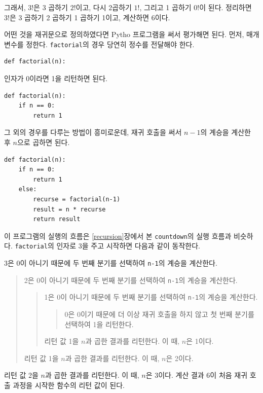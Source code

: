 \documentclass[10pt]{book}
\begin{document}
그래서, $3!$은 3 곱하기 $2!$이고, 다시 2곱하기 $1!$, 그리고 1 곱하기
$0!$이 된다.  정리하면 $3!$은 3 곱하기 2 곱하기 1 곱하기 1이고,
계산하면 6이다.

어떤 것을 재귀문으로 정의하였다면 Pytho 프로그램을 써서 평가해면 된다.
먼저, 매개 변수를 정한다.  {\tt factorial}의 경우 당연히 정수를
전달해야 한다.

\begin{verbatim}
def factorial(n):
\end{verbatim}
%
인자가 0이라면 1을 리턴하면 된다.

\begin{verbatim}
def factorial(n):
    if n == 0:
        return 1
\end{verbatim}
%
그 외의 경우를 다루는 방법이 흥미로운데, 재귀 호출을 써서 $n-1$의
계승을 계산한 후 $n$으로 곱하면 된다.

\begin{verbatim}
def factorial(n):
    if n == 0:
        return 1
    else:
        recurse = factorial(n-1)
        result = n * recurse
        return result
\end{verbatim}
%
이 프로그램의 실행의 흐름은 \ref{recursion}장에서 본 {\tt countdown}의
실행 흐름과 비슷하다. {\tt factorial}의 인자로 3을 주고 시작하면 다음과
같이 동작한다.


3은 0이 아니기 때문에 두 번째 분기를 선택하여 {\tt n-1}의 계승을 계산한다. 

\begin{quote}
  2은 0이 아니기 때문에 두 번째 분기를 선택하여 {\tt n-1}의 계승을
  계산한다.



  \begin{quote}
    1은 0이 아니기 때문에 두 번째 분기를 선택하여 {\tt n-1}의 계승을
    계산한다.

    \begin{quote}
      0은 0이기 때문에 더 이상 재귀 호출을 하지 않고 첫 번째 분기를
      선택하여 1을 리턴한다.
    \end{quote}

    리턴 값 1을  $n$과 곱한 결과를 리턴한다.  이 때, $n$은 1이다. 
  \end{quote}

    리턴 값 1을  $n$과 곱한 결과를 리턴한다.  이 때, $n$은 2이다. 

\end{quote}

리턴 값 2을  $n$과 곱한 결과를 리턴한다.  이 때, $n$은 3이다.  계산 결과 6이 처음 재귀 호출 과정을 시작한 함수의 리턴 값이 된다. 
\end{document}
